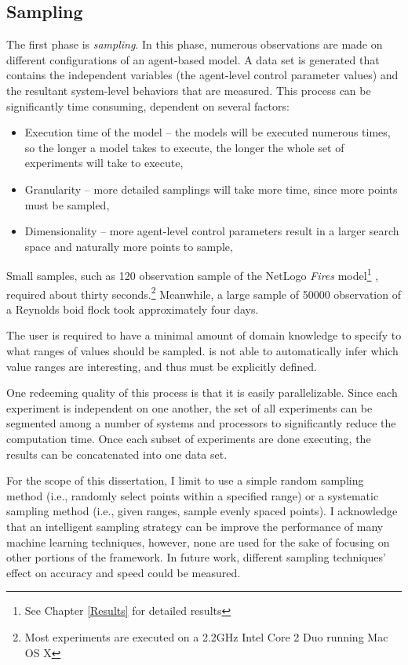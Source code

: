 \subsection{Sampling}
The first phase is \textit{sampling}.
In this phase, numerous observations are made on different configurations of an agent-based model.
A data set is generated that contains the independent variables (the agent-level control parameter values) and the resultant system-level behaviors that are measured.
This process can be significantly time consuming, dependent on several factors:
\begin{itemize}
  \item Execution time of the model -- the models will be executed numerous times, so the longer a model takes to execute, the longer the whole set of experiments will take to execute,
  \item Granularity -- more detailed samplings will take more time, since more points must be sampled,
  \item Dimensionality -- more agent-level control parameters result in a larger search space and naturally more points to sample,
\end{itemize}
Small samples, such as 120 observation sample of the NetLogo \textit{Fires} model\footnote{See Chapter \ref{Results} for detailed results} \cite{fires} , required about thirty seconds.\footnote{Most experiments are executed on a 2.2GHz Intel Core 2 Duo running Mac OS X}
Meanwhile, a large sample of 50000 observation of a Reynolds boid flock \cite{reynolds1987} took approximately four days.

The user is required to have a minimal amount of domain knowledge to specify to \fw what ranges of values should be sampled.
\fw is not able to automatically infer which value ranges are interesting, and thus must be explicitly defined.

One redeeming quality of this process is that it is easily parallelizable.
Since each experiment is independent on one another, the set of all experiments can be segmented among a number of systems and processors to significantly reduce the computation time.
Once each subset of experiments are done executing, the results can be concatenated into one data set.

For the scope of this dissertation, I limit \fw to use a simple random sampling method (i.e., randomly select points within a specified range) or a systematic sampling method (i.e., given ranges, sample evenly spaced points).
I acknowledge that an intelligent sampling strategy can be improve the performance of many machine learning techniques, however, none are used for the sake of focusing on other portions of the framework.
In future work, different sampling techniques' effect on accuracy and speed could be measured.



